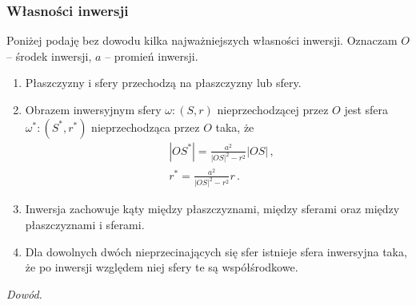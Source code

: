 \documentclass[../main.tex]{subfiles}
\begin{document}
\subsubsection*{Własności inwersji}
Poniżej podaję bez dowodu kilka najważniejszych własności inwersji. Oznaczam \(O\) -- środek inwersji, \(a\) -- promień inwersji.
\begin{enumerate}
    \item Płaszczyzny i sfery przechodzą na płaszczyzny lub sfery.
    \item Obrazem inwersyjnym sfery \(\omega:(S,r)\) nieprzechodzącej przez \(O\) jest sfera \(\omega^*:(S^*,r^*)\) nieprzechodząca przez \(O\) taka, że
    \begin{equation*}
    \begin{split}
        &|OS^*|=\frac{a^2}{|OS|^2-r^2}|OS|\,,\\
        &r^*=\frac{a^2}{|OS|^2-r^2}r\,.
    \end{split}
    \end{equation*}

    \item Inwersja zachowuje kąty między płaszczyznami, między sferami oraz między płaszczyznami i sferami.
    
    \item Dla dowolnych dwóch nieprzecinających się sfer istnieje sfera inwersyjna taka, że po inwersji względem niej sfery te są współśrodkowe.

\end{enumerate}
\noindent{}
\medskip

\noindent\textit{Dowód.}
\medskip
\end{document}
